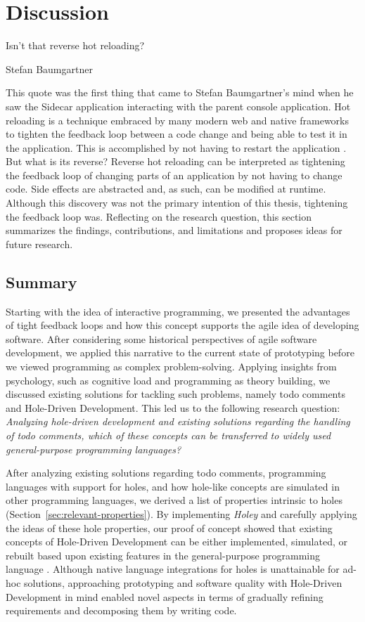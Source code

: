 \chapter{Discussion}
\label{cha:discussion}
\epigraph{Isn't that reverse hot reloading?}{Stefan Baumgartner}
\noindent This quote was the first thing that came to Stefan Baumgartner's mind when he saw the Sidecar application interacting with the parent console application.
Hot reloading is a technique embraced by many modern web and native frameworks to tighten the feedback loop between a code change and being able to test it in the application.
This is accomplished by not having to restart the application \cite{czaplicki_interactive_2013}.
But what is its reverse?
Reverse hot reloading can be interpreted as tightening the feedback loop of changing parts of an application by not having to change code.
Side effects are abstracted and, as such, can be modified at runtime.
Although this discovery was not the primary intention of this thesis, tightening the feedback loop was.
Reflecting on the research question, this section summarizes the findings, contributions, and limitations and proposes ideas for future research.

\section{Summary}
\label{sec:discussion-summary}
Starting with the idea of interactive programming, we presented the advantages of tight feedback loops and how this concept supports the agile idea of developing software.
After considering some historical perspectives of agile software development, we applied this narrative to the current state of prototyping before we viewed programming as complex problem-solving.
Applying insights from psychology, such as cognitive load and programming as theory building, we discussed existing solutions for tackling such problems, namely todo comments and Hole-Driven Development.
This led us to the following research question: \emph{Analyzing hole-driven development and existing solutions regarding the handling of todo comments, which of these concepts can be transferred to widely used general-purpose programming languages?}

After analyzing existing solutions regarding todo comments, programming languages with support for holes, and how hole-like concepts are simulated in other programming languages, we derived a list of properties intrinsic to holes (Section~\ref{sec:relevant-properties}).
By implementing \emph{Holey} and carefully applying the ideas of these hole properties, our proof of concept showed that existing concepts of Hole-Driven Development can be either implemented, simulated, or rebuilt based upon existing features in the general-purpose programming language \CS.
Although native language integrations for holes is unattainable for ad-hoc solutions, approaching prototyping and software quality with Hole-Driven Development in mind enabled novel aspects in terms of gradually refining requirements and decomposing them by writing code.


